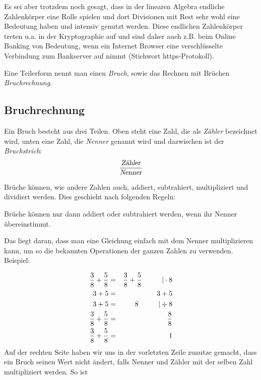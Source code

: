 Es sei aber trotzdem noch gesagt, dass in der linearen Algebra endliche Zahlenkörper eine Rolle spielen und dort Divisionen mit Rest sehr wohl eine Bedeutung haben und intensiv genutzt werden. Diese endlichen Zahlenkörper treten u.a. in der Kryptographie auf und sind daher auch z.B. beim Online Banking von Bedeutung, wenn ein Internet Browser eine verschlüsselte Verbindung zum Bankserver auf nimmt (Stichwort https-Protokoll).

\begin{definition}
Eine Teilerform nennt man einen \textsl{Bruch}, sowie das Rechnen mit Brüchen \textsl{Bruchrechnung}.
\end{definition}

\subsection{Bruchrechnung}

\begin{definition}
Ein Bruch besteht aus drei Teilen. Oben steht eine Zahl, die als \textsl{Zähler} bezeichnet wird, unten eine Zahl, die \textsl{Nenner} genannt wird und dazwischen ist der \textsl{Bruchstrich}:
\[ \frac{\textsl{Zähler}}{\textsl{Nenner}} \]
\end{definition}

Brüche können, wie andere Zahlen auch, addiert, subtrahiert, multipliziert und dividiert werden. Dies geschieht nach folgenden Regeln:

\begin{definition}
Brüche können nur dann addiert oder subtrahiert werden, wenn ihr Nenner übereinstimmt. 
\end{definition}

Das liegt daran, dass man eine Gleichung einfach mit dem Nenner multiplizieren kann, um so die bekannten Operationen der ganzen Zahlen zu verwenden. Beispiel:

\begin{eqnarray*}
\frac{3}{8}+\frac{5}{8} &=& \frac{3}{8}+\frac{5}{8} \hskip 1cm | \cdot 8 \\
3 +5 &=& 3+5 \\
3+5 &=& 8 \hskip 1cm | \div 8\\
\frac{3}{8}+\frac{5}{8} &=& \frac{8}{8} \\
\frac{3}{8}+\frac{5}{8} &=& 1
\end{eqnarray*}
Auf der rechten Seite haben wir uns in der vorletzten Zeile zunutze gemacht, dass ein Bruch seinen Wert nicht ändert, falls Nenner und Zähler mit der selben Zahl multipliziert werden. So ist 

